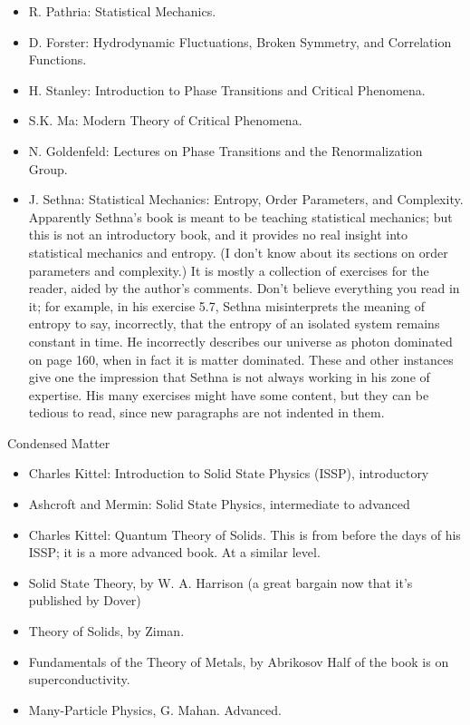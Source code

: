 \documentclass[10pt,a4paper]{book}
\theoremstyle{definition}
\begin{document}
\begin{itemize}
\item R. Pathria: Statistical Mechanics.
\item D. Forster: Hydrodynamic Fluctuations, Broken Symmetry, and Correlation Functions.
\item H. Stanley: Introduction to Phase Transitions and Critical Phenomena.
\item S.K. Ma: Modern Theory of Critical Phenomena.
\item N. Goldenfeld: Lectures on Phase Transitions and the Renormalization Group.
\item J. Sethna: Statistical Mechanics: Entropy, Order Parameters, and Complexity.
Apparently Sethna's book is meant to be teaching statistical mechanics; but this is not an introductory book, and it provides no real insight into statistical mechanics and entropy.  (I don't know about its sections on order parameters and complexity.)  It is mostly a collection of exercises for the reader, aided by the author's comments.  Don't believe everything you read in it; for example, in his exercise 5.7, Sethna misinterprets the meaning of entropy to say, incorrectly, that the entropy of an isolated system remains constant in time.  He incorrectly describes our universe as photon dominated on page 160, when in fact it is matter dominated.  These and other instances give one the impression that Sethna is not always working in his zone of expertise.  His many exercises might have some content, but they can be tedious to read, since new paragraphs are not indented in them.
\end{itemize}


Condensed Matter

\begin{itemize}
\item  Charles Kittel: Introduction to Solid State Physics (ISSP),
introductory
\item Ashcroft and Mermin: Solid State Physics,
intermediate to advanced
\item Charles Kittel: Quantum Theory of Solids.
This is from before the days of his ISSP; it is a more advanced book.  At a similar level.
\item Solid State Theory, by W. A. Harrison
(a great bargain now that it's published by Dover)
\item Theory of Solids, by Ziman.
\item Fundamentals of the Theory of Metals, by Abrikosov
Half of the book is on superconductivity.
\item Many-Particle Physics, G. Mahan.
Advanced.
\end{itemize}
\end{document}
